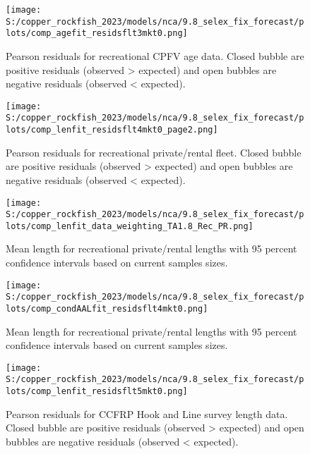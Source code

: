 \documentclass[11pt,
  english,
  letterpaper,
]{article}
\begin{document}
\pagebreak

\begin{figure}
\centering
\texttt{[image: S:/copper\_rockfish\_2023/models/nca/9.8\_selex\_fix\_forecast/plots/comp\_agefit\_residsflt3mkt0.png]}
\caption{Pearson residuals for recreational CPFV age data. Closed bubble are positive residuals (observed \textgreater{} expected) and open bubbles are negative residuals (observed \textless{} expected).\label{fig:rec-cpfv-age-pearson}}
\end{figure}

\pagebreak

\begin{figure}
\centering
\texttt{[image: S:/copper\_rockfish\_2023/models/nca/9.8\_selex\_fix\_forecast/plots/comp\_lenfit\_residsflt4mkt0\_page2.png]}
\caption{Pearson residuals for recreational private/rental fleet. Closed bubble are positive residuals (observed \textgreater{} expected) and open bubbles are negative residuals (observed \textless{} expected).\label{fig:rec-pr-pearson}}
\end{figure}

\pagebreak

\begin{figure}
\centering
\texttt{[image: S:/copper\_rockfish\_2023/models/nca/9.8\_selex\_fix\_forecast/plots/comp\_lenfit\_data\_weighting\_TA1.8\_Rec\_PR.png]}
\caption{Mean length for recreational private/rental lengths with 95 percent confidence intervals based on current samples sizes.\label{fig:rec-pr-mean-len-fit}}
\end{figure}

\pagebreak

\begin{figure}
\centering
\texttt{[image: S:/copper\_rockfish\_2023/models/nca/9.8\_selex\_fix\_forecast/plots/comp\_condAALfit\_residsflt4mkt0.png]}
\caption{Mean length for recreational private/rental lengths with 95 percent confidence intervals based on current samples sizes.\label{fig:rec-pr-age-pearson}}
\end{figure}

\begin{figure}
\centering
\texttt{[image: S:/copper\_rockfish\_2023/models/nca/9.8\_selex\_fix\_forecast/plots/comp\_lenfit\_residsflt5mkt0.png]}
\caption{Pearson residuals for CCFRP Hook and Line survey length data. Closed bubble are positive residuals (observed \textgreater{} expected) and open bubbles are negative residuals (observed \textless{} expected).\label{fig:ccfrp-len-pearson}}
\end{figure}
\end{document}
